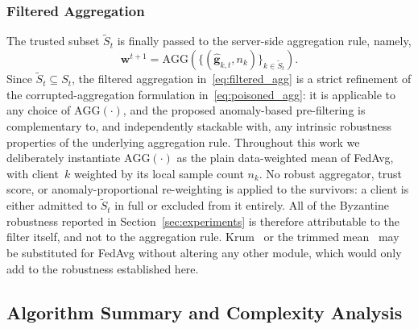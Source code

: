\documentclass[journal]{IEEEtran}
\begin{document}
\subsubsection{Filtered Aggregation}
The trusted subset $\widetilde{S}_t$ is finally passed to the server-side aggregation rule, namely,
\begin{equation}
\mathbf{w}^{t+1} = \text{AGG}\!\left(\{(\hat{\mathbf{g}}_{k,t}, n_k)\}_{k \in \widetilde{S}_t}\right).
\label{eq:filtered_agg}
\end{equation}
Since $\widetilde{S}_t \subseteq S_t$, the filtered aggregation in~\eqref{eq:filtered_agg} is a strict refinement of the corrupted-aggregation formulation in~\eqref{eq:poisoned_agg}: it is applicable to any choice of $\text{AGG}(\cdot)$, and the proposed anomaly-based pre-filtering is complementary to, and independently stackable with, any intrinsic robustness properties of the underlying aggregation rule. Throughout this work we deliberately instantiate $\text{AGG}(\cdot)$ as the plain data-weighted mean of FedAvg, with client~$k$ weighted by its local sample count $n_k$. No robust aggregator, trust score, or anomaly-proportional re-weighting is applied to the survivors: a client is either admitted to $\widetilde{S}_t$ in full or excluded from it entirely. All of the Byzantine robustness reported in Section~\ref{sec:experiments} is therefore attributable to the filter itself, and not to the aggregation rule. Krum~\cite{blanchard2017machine} or the trimmed mean~\cite{yin2018byzantine} may be substituted for FedAvg without altering any other module, which would only add to the robustness established here.

\subsection{Algorithm Summary and Complexity Analysis}
\label{sec:complexity}
\end{document}
